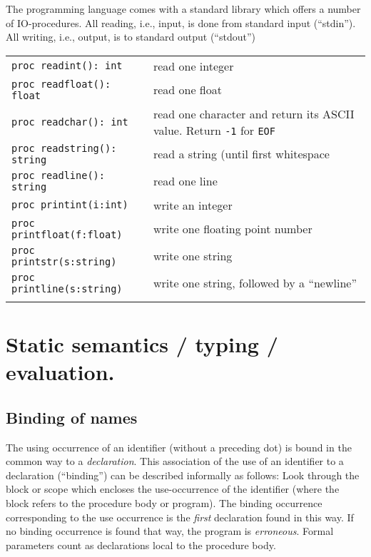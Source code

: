 \documentclass[11pt]{article}
\begin{document}
The programming language comes with a standard library which offers a
number of IO-procedures. All reading, i.e., input, is done from standard
input (``stdin''). All writing, i.e., output, is to standard output
(``stdout'')

\begin{center}
\begin{tabular}{ll}
 & \\
\hline
\texttt{proc readint(): int} & read one integer\\
\texttt{proc readfloat(): float} & read one float\\
\texttt{proc readchar(): int} & read one character and return its ASCII value. Return \texttt{-1} for \texttt{EOF}\\
\texttt{proc readstring(): string} & read a string (until  first whitespace\\
\texttt{proc readline(): string} & read one line\\
\hline
\texttt{proc printint(i:int)} & write an integer\\
\texttt{proc printfloat(f:float)} & write one floating point number\\
\texttt{proc printstr(s:string)} & write one string\\
\texttt{proc printline(s:string)} & write one string, followed by a ``newline''\\
 & \\
\end{tabular}

\end{center}


\section{Static semantics / typing / evaluation.}
\label{sec:org816df5f}

\subsection{Binding of names}
\label{sec:org78c4750}
The using occurrence of an identifier (without a preceding dot) is bound in
the common way to a \emph{declaration}. This association of the use of an
identifier to a declaration (``binding'') can be described informally as
follows: Look through the block or scope which encloses the use-occurrence
of the identifier (where the block refers to the procedure body or
program). The binding occurrence corresponding to the use occurrence is the
\emph{first} declaration found in this way.  If no binding occurrence is found
that way, the program is \emph{erroneous}. Formal parameters count as
declarations local to the procedure body.
\end{document}

